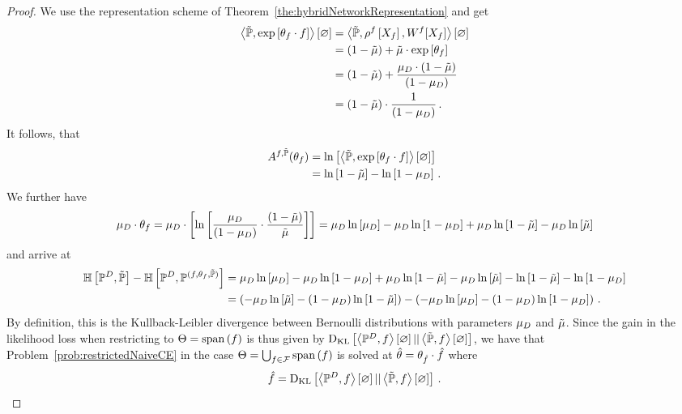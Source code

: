 \begin{proof}
	We use the representation scheme of Theorem~\ref{the:hybridNetworkRepresentation} and get
	\begin{align*}
		\left\langle \tilde{\mathbb{P}}, \mathrm{exp}\left[\theta_{f} \cdot f\right]\right\rangle \left[ \varnothing \right]
		& = \left\langle \tilde{\mathbb{P}}, \rho^{f}\left[X_{f}\right], W^{f}[X_{f}]\right\rangle \left[ \varnothing \right] \\
		& = (1-\tilde{\mu}) + \tilde{\mu}\cdot \mathrm{exp}\left[\theta_{f}\right] \\
		& = (1 - \tilde{\mu}) + \frac{\mu_{D} \cdot (1-\tilde{\mu})}{(1-\mu_{D})} \\
		& = (1-\tilde{\mu}) \cdot \frac{1}{(1-\mu_{D})} \, . 
	\end{align*}
	It follows, that
	\begin{align*}
		A^{f,\tilde{\mathbb{P}}}(\theta_{f}) 
		& = \ln \left[ \left\langle \tilde{\mathbb{P}}, \mathrm{exp}\left[\theta_{f} \cdot f\right]\right\rangle \left[ \varnothing \right] \right] \\
		& = \ln \left[ 1-\tilde{\mu} \right] - \ln \left[ 1-\mu_{D} \right] \, . 
	\end{align*}
	We further have
	\begin{align*}
		\mu_{D} \cdot \theta_{f}
		= \mu_{D} \cdot \left[ \ln \left[ \frac{\mu_{D}}{(1-\mu_{D})}\cdot \frac{(1-\tilde{\mu})}{\tilde{\mu}} \right]  \right]	
		= \mu_{D} \ln \left[ \mu_{D} \right] - \mu_{D} \ln \left[ 1-\mu_{D} \right] + \mu_{D} \ln \left[ 1-\tilde{\mu} \right] - \mu_{D} \ln \left[ \tilde{\mu} \right]
	\end{align*}
	and arrive at
	\begin{align*}
		\mathbb{H}\left[\mathbb{P}^{D},\tilde{\mathbb{P}}\right]
		- \mathbb{H}\left[\mathbb{P}^{D},\mathbb{P}^{(f,\theta_{f},\tilde{\mathbb{P}})}\right]
		& =  \mu_{D} \ln \left[ \mu_{D} \right] - \mu_{D} \ln \left[ 1-\mu_{D} \right] + \mu_{D} \ln \left[ 1-\tilde{\mu} \right] - \mu_{D} \ln \left[ \tilde{\mu} \right]
		-  \ln \left[ 1-\tilde{\mu} \right] - \ln \left[ 1-\mu_{D} \right] \\
		& = \left( -\mu_{D} \ln \left[ \tilde{\mu} \right] - (1-\mu_{D}) \ln \left[ 1-\tilde{\mu} \right] \right)  - \left( -\mu_{D} \ln \left[ \mu_{D} \right] - (1-\mu_{D}) \ln \left[ 1-\mu_{D} \right] \right) \, . 
	\end{align*}
	By definition, this is the Kullback-Leibler divergence between Bernoulli distributions with parameters $\mu_{D}$ and $\tilde{\mu}$.
	Since the gain in the likelihood loss when restricting to $\Theta = \mathrm{span}\left(f\right)$ is thus given by $\mathrm{D}_{\mathrm{KL}}\left[ \left\langle \mathbb{P}^{D},f\right\rangle \left[ \varnothing \right] || \left\langle \tilde{\mathbb{P}},f\right\rangle \left[ \varnothing \right] \right]$, we have that Problem~\ref{prob:restrictedNaiveCE}  in the case $\Theta = \bigcup_{f\in\mathcal{F}}\mathrm{span}\left(f\right)$ is solved at $\hat{\theta} = \theta_{\hat{f}}\cdot \hat{f}$ where
		\[ \hat{f} = \mathrm{D}_{\mathrm{KL}}\left[ \left\langle \mathbb{P}^{D},f\right\rangle \left[ \varnothing \right] || \left\langle \tilde{\mathbb{P}},f\right\rangle \left[ \varnothing \right] \right] \, . \]
\end{proof}

